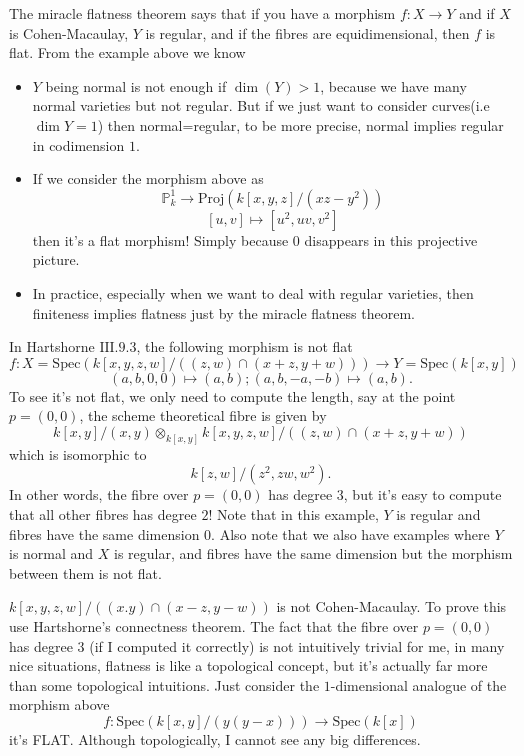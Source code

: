 \documentclass[../main.tex]{subfiles}
\begin{document}
\begin{remark}
The miracle flatness theorem says that if you have a morphism $f:X\rightarrow Y$ and if $X$ is Cohen-Macaulay, $Y$ is regular, and if the fibres are equidimensional, then $f$ is flat. From the example above we know
\begin{itemize}
\item $Y$ being normal is not enough if $\dim(Y)>1$, because we have many normal varieties but not regular. But if we just want to consider curves(i.e $\dim Y=1$) then normal=regular, to be more precise, normal implies regular in codimension $1$.
\item If we consider the morphism above as 
$$\mathbb{P}_{k}^{1}\rightarrow \mathrm{Proj}(k[x,y,z]/(xz-y^{2}))$$
$$[u,v]\mapsto [u^{2},uv, v^{2}]$$
then it's a flat morphism! Simply because $0$ disappears in this projective picture.
\item In practice, especially when we want to deal with regular varieties, then finiteness implies flatness just by the miracle flatness theorem.
\end{itemize}
\end{remark}
\begin{example}
In Hartshorne $\mathrm{III}.9.3$, the following morphism is not flat
$$f: X=\mathrm{Spec}(k[x,y,z,w]/((z,w)\cap (x+z,y+w)))\rightarrow Y=\mathrm{Spec}(k[x,y])$$
$$(a,b,0,0)\mapsto (a,b); (a,b,-a,-b)\mapsto (a,b). $$
To see it's not flat, we only need to compute the length, say at the point $p=(0,0)$, the scheme theoretical fibre is given by 
$$k[x,y]/(x,y)\otimes_{k[x,y]}k[x,y,z,w]/((z,w)\cap (x+z,y+w))$$
which is isomorphic to $$k[z,w]/(z^{2},zw,w^{2}).$$
In other words, the fibre over $p=(0,0)$ has degree $3$, but it's easy to compute that all other fibres has degree $2$!
Note that in this example, $Y$ is regular and fibres have the same dimension $0$. Also note that we also have examples where $Y$ is normal and $X$ is regular, and fibres have the same dimension but the morphism between them is not flat.
\end{example}
\begin{remark}[Why?]
$k[x,y,z,w]/((x.y)\cap(x-z,y-w))$ is not Cohen-Macaulay. To prove this use Hartshorne's connectness theorem. The fact that the fibre over $p=(0,0)$ has degree $3$ (if I computed it correctly) is not intuitively trivial for me, in many nice situations, flatness is like a topological concept, but it's actually far more than some topological intuitions. Just consider the $1$-dimensional analogue of the morphism above
$$f:\mathrm{Spec}(k[x,y]/(y(y-x)))\rightarrow \mathrm{Spec}(k[x])$$
it's  FLAT. Although topologically, I cannot see any big differences.
\end{remark}
\end{document}
